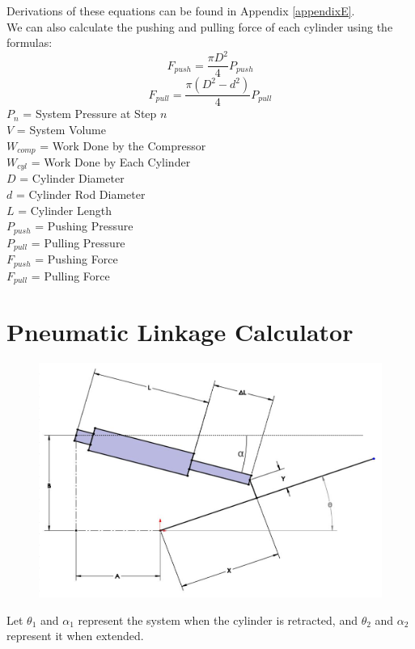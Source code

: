 \documentclass[11pt,a4paper,titlepage]{article}
\begin{document}
	Derivations of these equations can be found in Appendix \ref{appendixE}. \\
	
	We can also calculate the pushing and pulling force of each cylinder using the formulas:
	\begin{equation}
	F_{push} = \frac{\pi D^2}{4} P_{push}
	\end{equation}
	\begin{equation}
	F_{pull} = \frac{\pi (D^2 - d^2)}{4} P_{pull}
	\end{equation}
	$P_n$ = System Pressure at Step $n$\\
	$V$ = System Volume \\
	$W_{comp}$ = Work Done by the Compressor \\
	$W_{cyl}$ = Work Done by Each Cylinder \\
	$D$ = Cylinder Diameter \\
	$d$ = Cylinder Rod Diameter \\
	$L$ = Cylinder Length \\
	$P_{push}$ = Pushing Pressure \\
	$P_{pull}$ = Pulling Pressure \\
	$F_{push}$ = Pushing Force \\
	$F_{pull}$ = Pulling Force
	
	\newpage
	\section{Pneumatic Linkage Calculator}
	\begin{figure}[H]
		\centering
		\includegraphics[width=0.8\linewidth]{Pneu_Link}
	\end{figure}
	
	Let $\theta_1$ and $\alpha_1$ represent the system when the cylinder is retracted, and $\theta_2$ and $\alpha_2$ represent it when extended. \\ \\
	
\end{document}
